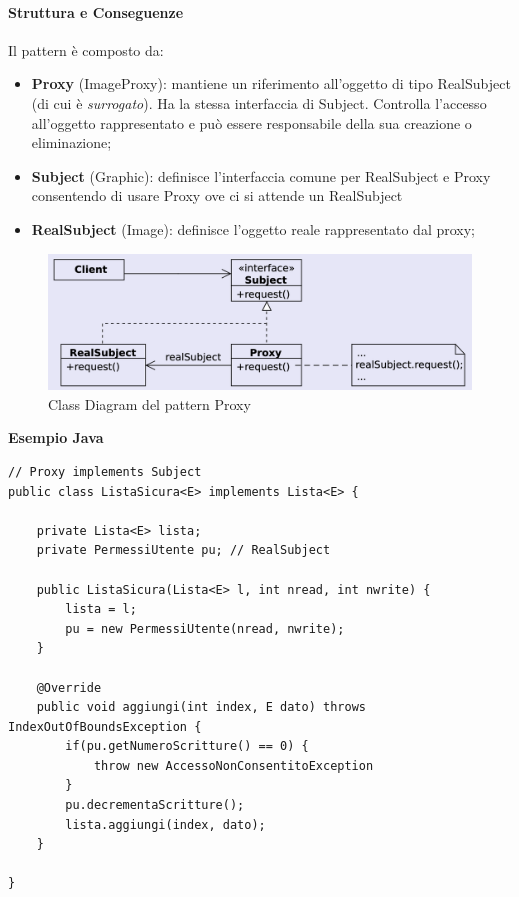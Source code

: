 \paragraph{Struttura e Conseguenze} Il pattern è composto da:
\begin{itemize}
    \item \textbf{Proxy} (ImageProxy): mantiene un riferimento all'oggetto di tipo RealSubject (di cui è \textit{surrogato}). Ha la stessa interfaccia di Subject. Controlla l'accesso all'oggetto rappresentato e può essere responsabile della sua creazione o eliminazione;
    \item \textbf{Subject} (Graphic): definisce l'interfaccia comune per RealSubject e Proxy consentendo di usare Proxy ove ci si attende un RealSubject
    \item \textbf{RealSubject} (Image): definisce l'oggetto reale rappresentato dal proxy;
\end{itemize}


\begin{figure}[H]
    \centering
    \includegraphics[width=1\linewidth]{assets/pattern/proxy/proxy-struttura.png}
    \caption{Class Diagram del pattern Proxy}
\end{figure}

\textbf{Esempio Java}
\begin{verbatim}
// Proxy implements Subject
public class ListaSicura<E> implements Lista<E> {

    private Lista<E> lista;
    private PermessiUtente pu; // RealSubject

    public ListaSicura(Lista<E> l, int nread, int nwrite) {
        lista = l;
        pu = new PermessiUtente(nread, nwrite);
    }

    @Override
    public void aggiungi(int index, E dato) throws IndexOutOfBoundsException {
        if(pu.getNumeroScritture() == 0) {
            throw new AccessoNonConsentitoException
        }
        pu.decrementaScritture();
        lista.aggiungi(index, dato);
    }

}
\end{verbatim}


\newpage